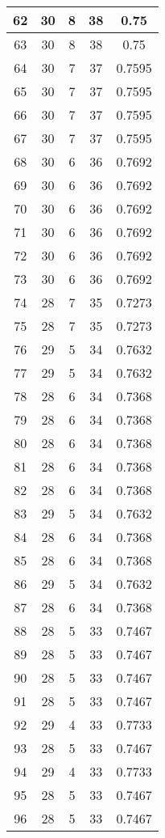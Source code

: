 \documentclass[letterpaper, 12pt]{article}
\begin{document}
\begin{longtable}{|c|c|c|c|c|}
\hline
62 & 30 & 8 & 38 & 0.75 \\
\hline
63 & 30 & 8 & 38 & 0.75 \\
\hline
64 & 30 & 7 & 37 & 0.7595 \\
\hline
65 & 30 & 7 & 37 & 0.7595 \\
\hline
66 & 30 & 7 & 37 & 0.7595 \\
\hline
67 & 30 & 7 & 37 & 0.7595 \\
\hline
68 & 30 & 6 & 36 & 0.7692 \\
\hline
69 & 30 & 6 & 36 & 0.7692 \\
\hline
70 & 30 & 6 & 36 & 0.7692 \\
\hline
71 & 30 & 6 & 36 & 0.7692 \\
\hline
72 & 30 & 6 & 36 & 0.7692 \\
\hline
73 & 30 & 6 & 36 & 0.7692 \\
\hline
74 & 28 & 7 & 35 & 0.7273 \\
\hline
75 & 28 & 7 & 35 & 0.7273 \\
\hline
76 & 29 & 5 & 34 & 0.7632 \\
\hline
77 & 29 & 5 & 34 & 0.7632 \\
\hline
78 & 28 & 6 & 34 & 0.7368 \\
\hline
79 & 28 & 6 & 34 & 0.7368 \\
\hline
80 & 28 & 6 & 34 & 0.7368 \\
\hline
81 & 28 & 6 & 34 & 0.7368 \\
\hline
82 & 28 & 6 & 34 & 0.7368 \\
\hline
83 & 29 & 5 & 34 & 0.7632 \\
\hline
84 & 28 & 6 & 34 & 0.7368 \\
\hline
85 & 28 & 6 & 34 & 0.7368 \\
\hline
86 & 29 & 5 & 34 & 0.7632 \\
\hline
87 & 28 & 6 & 34 & 0.7368 \\
\hline
88 & 28 & 5 & 33 & 0.7467 \\
\hline
89 & 28 & 5 & 33 & 0.7467 \\
\hline
90 & 28 & 5 & 33 & 0.7467 \\
\hline
91 & 28 & 5 & 33 & 0.7467 \\
\hline
92 & 29 & 4 & 33 & 0.7733 \\
\hline
93 & 28 & 5 & 33 & 0.7467 \\
\hline
94 & 29 & 4 & 33 & 0.7733 \\
\hline
95 & 28 & 5 & 33 & 0.7467 \\
\hline
96 & 28 & 5 & 33 & 0.7467 \\

\end{longtable}
\end{document}
